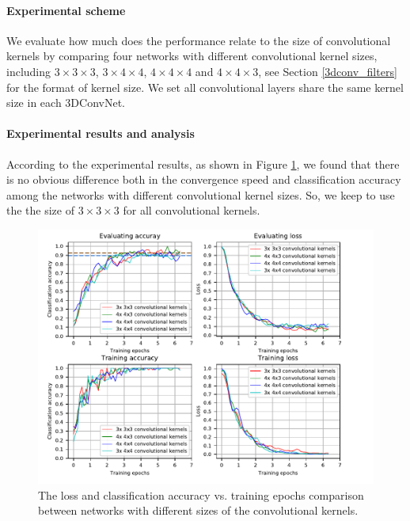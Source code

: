 \paragraph{Experimental scheme}
We evaluate how much does the performance relate to the size of convolutional kernels by comparing four networks with different convolutional kernel sizes, including \(3 \times 3 \times 3\), \(3\times 4 \times 4\), \(4\times4\times4\) and \(4\times 4 \times 3\), see Section \ref{3dconv_filters} for the format of kernel size. We set all convolutional layers share the same kernel size in each 3DConvNet. 

\paragraph{Experimental results and analysis}
According to the experimental results, as shown in Figure \ref{fig:plot_cnn_kernel}, we found that there is no obvious difference both in the convergence speed and classification accuracy among the networks with different convolutional kernel sizes. So, we keep to use the the size of \(3\times 3 \times 3\) for all convolutional kernels.
\begin{figure}
	\includegraphics[trim=0cm 0cm 0cm 0cm]{fig01/plot_cnn_kernel.pdf}
	\caption{The loss and classification accuracy vs. training epochs comparison between networks with different sizes of the convolutional kernels.}
	\label{fig:plot_cnn_kernel}
\end{figure}


